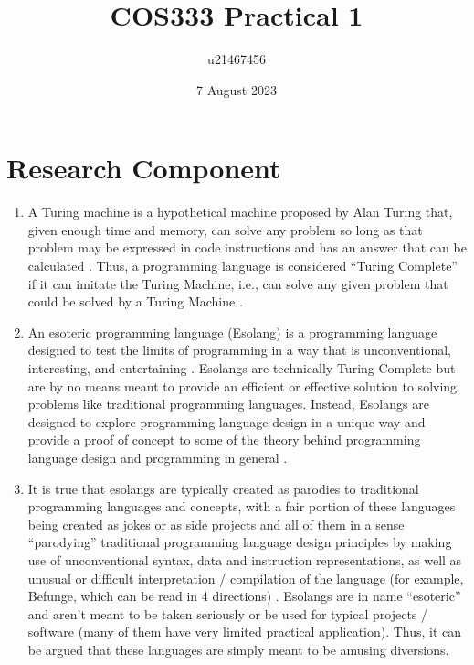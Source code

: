 \documentclass{article}
\title{COS333 Practical 1}
\author{u21467456}
\date{7 August 2023}
\begin{document}
\maketitle

\section{Research Component}
\begin{enumerate}
    \item A Turing machine is a hypothetical machine proposed by Alan Turing that, given enough time and memory, can solve any problem so long as that problem may be expressed in code instructions and has an answer that can be calculated \cite{BinanceAcademy_2023}. Thus, a programming language is considered “Turing Complete” if it can imitate the Turing Machine, i.e., can solve any given problem that could be solved by a Turing Machine \cite{BinanceAcademy_2023}.\\
    
    \item An esoteric programming language (Esolang) is a programming language designed to test the limits of programming in a way that is unconventional, interesting, and entertaining \cite{WikimediaFoundation_2023a}. Esolangs are technically Turing Complete but are by no means meant to provide an efficient or effective solution to solving problems like traditional programming languages. Instead, Esolangs are designed to explore programming language design in a unique way and provide a proof of concept to some of the theory behind programming language design and programming in general \cite{WikimediaFoundation_2023a}.\\
    
    \item It is true that esolangs are typically created as parodies to traditional programming languages and concepts, with a fair portion of these languages being created as jokes or as side projects and all of them in a sense “parodying” traditional programming language design principles by making use of unconventional syntax, data and instruction representations, as well as unusual or difficult interpretation / compilation of the language (for example, Befunge, which can be read in 4 directions) \cite{WikimediaFoundation_2023a}. Esolangs are in name “esoteric” and aren't meant to be taken seriously or be used for typical projects / software (many of them have very limited practical application). Thus, it can be argued that these languages are simply meant to be amusing diversions.
    

\end{enumerate}
\end{document}
